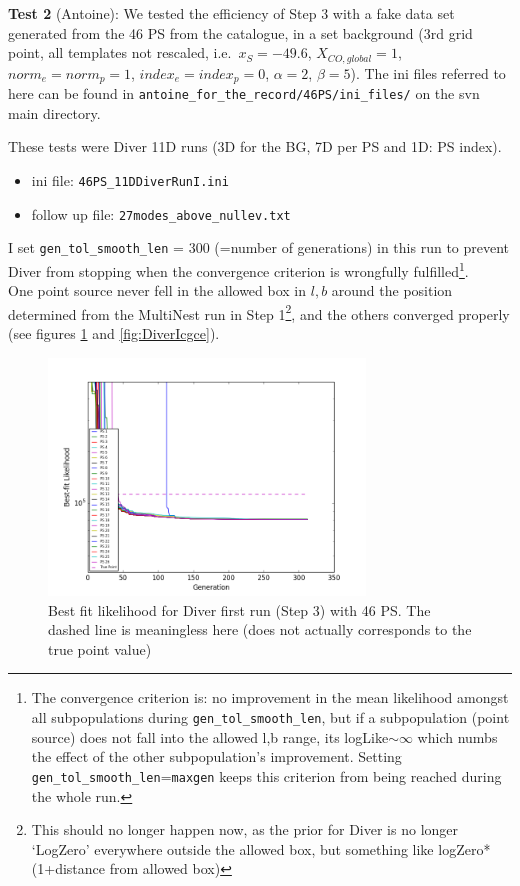\documentclass{article}
\begin{document}
\textbf{Test 2} (Antoine): We tested the efficiency of Step 3 with a fake data set generated from the 46 PS from the catalogue, in a set background (3rd grid point, all templates not rescaled, i.e.\ $x_S = -49.6$, $X_{CO, global} = 1$, $norm_e = norm_p = 1$, $index_e = index_p = 0$, $\alpha = 2$, $\beta = 5$). The ini files referred to here can be found in \verb=antoine_for_the_record/46PS/ini_files/= on the svn main directory. 

These tests were Diver 11D runs (3D for the BG, 7D per PS and 1D: PS index). \begin{itemize}
\item ini file: \verb=46PS_11DDiverRunI.ini=
\item follow up file: \verb=27modes_above_nullev.txt=
\end{itemize}
I set \verb=gen_tol_smooth_len= = 300 (=number of generations) in this run to prevent Diver from stopping when the convergence criterion is wrongfully fulfilled\footnote{The convergence criterion is: no improvement in the mean likelihood amongst all subpopulations during \verb=gen_tol_smooth_len=, but if a subpopulation (point source) does not fall into the allowed l,b range, its logLike$\sim \infty$ which numbs the effect of the other subpopulation's improvement. Setting \verb=gen_tol_smooth_len==\verb=maxgen= keeps this criterion from being reached during the whole run.}. \\
One point source never fell in the allowed box in $l,b$ around the position determined from the MultiNest run in Step 1\footnote{This should no longer happen now, as the prior for Diver is no longer `LogZero' everywhere outside the allowed box, but something like logZero*(1+distance from allowed box)}, and the others converged properly (see figures \ref{fig:DiverIBFLike} and \ref{fig:DiverIcgce}).
\begin{figure}[h]
\centering
\includegraphics[clip = true,width=0.75\textwidth]{figs/DiverIBFLike.png}
\caption{Best fit likelihood for Diver first run (Step 3) with 46 PS. The dashed line is meaningless here (does not actually corresponds to the true point value)\label{fig:DiverIBFLike}}
\end{figure}
\end{document}
